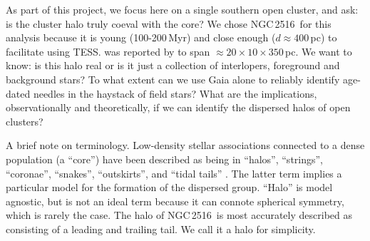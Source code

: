\documentclass[12pt,twocolumn,tighten]{aastex63}
\newcommand{\cn}{NGC\,2516} %
\begin{document}
As part of this project, we focus here on a single southern open
cluster, and ask: is the cluster halo truly coeval with the core?  We
chose \cn\ for this analysis because it is young (100-200\,Myr) and
close enough ($d\approx400$\,pc) to facilitate  using TESS.  
 was reported by
\citet{kounkel_untangling_2019} to span
$\approx20\times10\times350$\,pc.
We want to know: is this halo real or is it just a collection of
interlopers, foreground and background stars?  To what extent can we
use Gaia alone to reliably identify age-dated needles in the haystack
of field stars?  What are the implications, observationally and
theoretically, if we can identify the dispersed halos of open
clusters?


A brief note on terminology.  Low-density stellar associations
connected to a dense population (a ``core'') have been described as
being in ``halos'', ``strings'', ``coronae'', ``snakes'',
``outskirts'', and ``tidal tails'' \citep[{\it
e.g.},][]{chumak_tails_2006,davenport_death_2010,kounkel_untangling_2019,roser_hyades_2019,tian_discovery_2020,meingast_2021}.
The latter term implies a particular model for the formation of the
dispersed group.  ``Halo'' is model agnostic, but is not
an ideal term because it can connote spherical symmetry, which is rarely
the case.  The halo of \cn\ is most accurately described as consisting
of a leading and trailing tail.  We call it a halo for simplicity.
\end{document}
